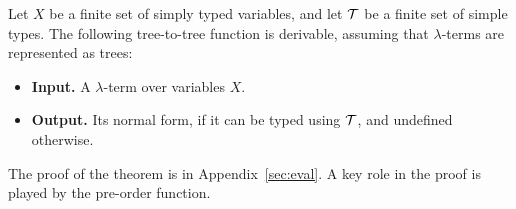 



\begin{theorem}\label{thm:normalise} Let $X$ be a finite set of simply typed variables, and let $\mathcal T$ be a finite set of simple types.
    The following tree-to-tree function is derivable, assuming that $\lambda$-terms are represented as trees:
    \begin{itemize}
        \item{\bf Input.} A $\lambda$-term over variables $X$.
        \item {\bf Output.} Its normal form, if it can be typed using ${\mathcal T}$, and undefined otherwise.
    \end{itemize}
\end{theorem}

The proof of the theorem is in Appendix~\ref{sec:eval}. A key role in the proof is played by the pre-order function. 




